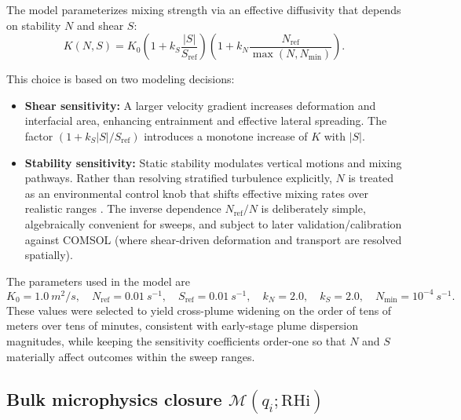 \documentclass[11pt]{article}
\begin{document}
The model parameterizes mixing strength via an effective diffusivity that depends on stability
$N$ and shear $S$:
\begin{equation}
K(N,S)=K_0\left(1+k_S\frac{|S|}{S_{\mathrm{ref}}}\right)\left(1+k_N\frac{N_{\mathrm{ref}}}{\max(N,N_{\min})}\right).
\label{eq:K}
\end{equation}

This choice is based on two modeling decisions:

\begin{itemize}
\item \textbf{Shear sensitivity:} A larger velocity gradient increases deformation and
interfacial area, enhancing entrainment and effective lateral spreading. The factor
$\left(1+k_S|S|/S_{\mathrm{ref}}\right)$ introduces a monotone increase of $K$ with $|S|$.

\item \textbf{Stability sensitivity:} Static stability modulates vertical motions and mixing pathways.
Rather than resolving stratified turbulence explicitly, $N$ is treated as an environmental control knob that shifts effective mixing rates over realistic ranges
\cite{Turner1973,Holton2013}.
 The inverse dependence
$N_{\mathrm{ref}}/N$ is deliberately simple, algebraically convenient for sweeps, and subject to
later validation/calibration against COMSOL (where shear-driven deformation and transport are
resolved spatially).
\end{itemize}

The parameters used in the model are
\[
K_0 = 1.0~\si{m^2/s},\quad
N_{\mathrm{ref}} = 0.01~\si{s^{-1}},\quad
S_{\mathrm{ref}} = 0.01~\si{s^{-1}},\quad
k_N = 2.0,\quad
k_S = 2.0,\quad
N_{\min}=10^{-4}~\si{s^{-1}}.
\]
These values were selected to yield cross-plume widening on the order of tens of meters over
tens of minutes, consistent with early-stage plume dispersion magnitudes, while keeping the
sensitivity coefficients order-one so that $N$ and $S$ materially affect outcomes within the
sweep ranges.

\subsection{Bulk microphysics closure $\mathcal{M}(q_i;\mathrm{RHi})$}
\label{sec:matlab_micro}
\end{document}
